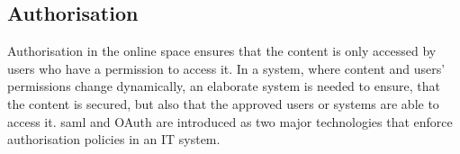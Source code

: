 \subsection{Authorisation} \label{authotization_sota}
Authorisation in the online space ensures that the content is only accessed by users who have a permission to access it. In a system, where content and users' permissions change dynamically, an elaborate system is needed to ensure, that the content is secured, but also that the approved users or systems are able to access it. \acrshort{saml} and OAuth are introduced as two major technologies that enforce authorisation policies in an IT system.


